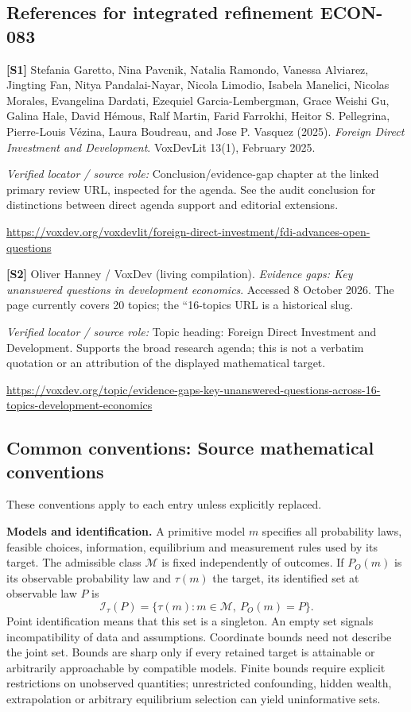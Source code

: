 \documentclass[11pt,a4paper]{article}
\begin{document}
\subsection*{References for integrated refinement ECON-083}
{\footnotesize\raggedright
\par\noindent\textbf{[S1]} Stefania Garetto, Nina Pavcnik, Natalia Ramondo, Vanessa Alviarez, Jingting Fan, Nitya Pandalai-Nayar, Nicola Limodio, Isabela Manelici, Nicolas Morales, Evangelina Dardati, Ezequiel Garcia-Lembergman, Grace Weishi Gu, Galina Hale, David Hémous, Ralf Martin, Farid Farrokhi, Heitor S. Pellegrina, Pierre-Louis Vézina, Laura Boudreau, and Jose P. Vasquez (2025). \emph{Foreign Direct Investment and Development}. VoxDevLit 13(1), February 2025.\par \textit{Verified locator / source role:} Conclusion/evidence-gap chapter at the linked primary review URL, inspected for the agenda. See the audit conclusion for distinctions between direct agenda support and editorial extensions.\par \url{https://voxdev.org/voxdevlit/foreign-direct-investment/fdi-advances-open-questions}\par\smallskip
\par\noindent\textbf{[S2]} Oliver Hanney / VoxDev (living compilation). \emph{Evidence gaps: Key unanswered questions in development economics}. Accessed 8 October 2026. The page currently covers 20 topics; the ``16-topics URL is a historical slug.\par \textit{Verified locator / source role:} Topic heading: Foreign Direct Investment and Development. Supports the broad research agenda; this is not a verbatim quotation or an attribution of the displayed mathematical target.\par \url{https://voxdev.org/topic/evidence-gaps-key-unanswered-questions-across-16-topics-development-economics}\par\smallskip
}

\subsection*{Common conventions: Source mathematical conventions}

These conventions apply to each entry unless explicitly replaced.

\textbf{Models and identification.} A primitive model \(m\) specifies all probability laws, feasible choices, information, equilibrium and measurement rules used by its target. The admissible class \(\mathcal M\) is fixed independently of outcomes. If \(P_O(m)\) is its observable probability law and \(\tau(m)\) the target, its identified set at observable law \(P\) is
\[
 \mathcal I_\tau(P)=\{\tau(m):m\in\mathcal M,\ P_O(m)=P\}.
\]
Point identification means that this set is a singleton. An empty set signals incompatibility of data and assumptions. Coordinate bounds need not describe the joint set. Bounds are sharp only if every retained target is attainable or arbitrarily approachable by compatible models. Finite bounds require explicit restrictions on unobserved quantities; unrestricted confounding, hidden wealth, extrapolation or arbitrary equilibrium selection can yield uninformative sets.
\end{document}
